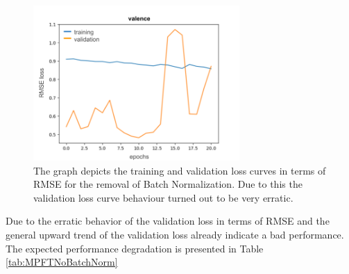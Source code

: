 \begin{figure}[htbp]
  \begin{center}
  \includegraphics[angle=0, width=0.7\textwidth]{Figures/Plot_AblationStudy_BatchNorm.png}
  \caption[Ablation study: BatchNormalization loss curve]{The graph depicts the training and validation loss curves in terms of RMSE for the removal of Batch Normalization. Due to this the validation loss curve behaviour turned out to be very erratic.}
  \label{fig:AblationNoBatchNorm}
  \end{center}
\end{figure}         

\noindent Due to the erratic behavior of the validation loss in terms of RMSE and the general upward trend of the validation loss already indicate a bad performance. The expected performance degradation is presented in Table \ref{tab:MPFTNoBatchNorm}

